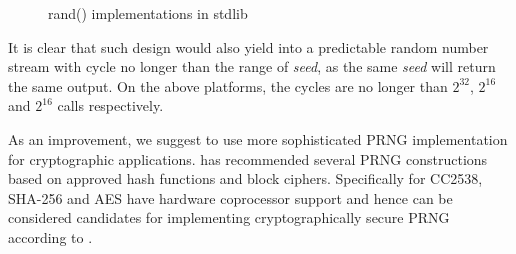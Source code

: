 \begin{figure}

\caption{rand() implementations in stdlib}
\label{rand}
\end{figure}

It is clear that such design would also yield into a predictable random number stream with cycle no longer than the range of \textit{seed}, as the same \textit{seed} will return the same output. On the above platforms, the cycles are no longer than $2^{32}$, $2^{16}$ and $2^{16}$ calls respectively.

As an improvement, we suggest to use more sophisticated PRNG implementation for cryptographic applications. \cite{NISTPRNG} has recommended several PRNG constructions based on approved hash functions and block ciphers. Specifically for CC2538, SHA-256 and AES have hardware coprocessor support and hence can be considered candidates for implementing cryptographically secure PRNG according to \cite{NISTPRNG}.


